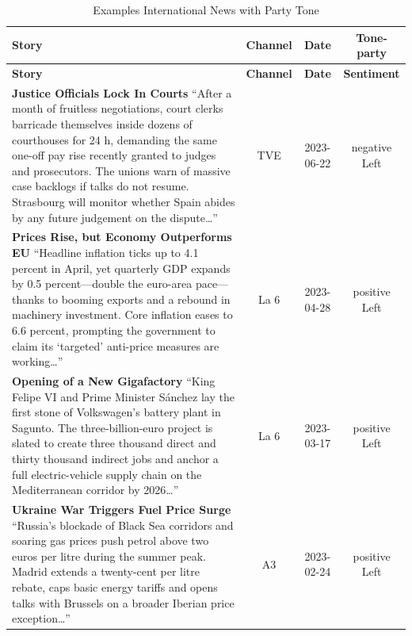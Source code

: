 \documentclass[12pt]{article}
\begin{document}
\begin{center}


\begin{longtable}{|p{8cm}|c|c|c|}
\caption{Examples International News with Party Tone}\\
	\hline
	\textbf{Story} & \textbf{Channel} & \textbf{Date} & \textbf{Tone-party} \\
	\hline
	\endfirsthead
	\hline
	\textbf{Story} & \textbf{Channel} & \textbf{Date} & \textbf{Sentiment} \\
	\hline
	\endhead
	
	\textbf{Justice Officials Lock In Courts}\newline
	{\scriptsize“After a month of fruitless negotiations, court clerks barricade themselves inside dozens of courthouses for 24 h, demanding the same one-off pay rise recently granted to judges and prosecutors.  The unions warn of massive case backlogs if talks do not resume.  Strasbourg will monitor whether Spain abides by any future judgement on the dispute…”}
	& TVE & 2023-06-22 & negative Left\\
	\hline
	
	\textbf{Prices Rise, but Economy Outperforms EU}\newline
	{\scriptsize“Headline inflation ticks up to 4.1 percent in April, yet quarterly GDP expands by 0.5 percent—double the euro-area pace—thanks to booming exports and a rebound in machinery investment.  Core inflation eases to 6.6 percent, prompting the government to claim its ‘targeted’ anti-price measures are working…”}
	& La 6 & 2023-04-28 & positive Left\\
	\hline
	
	\textbf{Opening of a New Gigafactory }\newline
	{\scriptsize“King Felipe VI and Prime Minister Sánchez lay the first stone of Volkswagen’s battery plant in Sagunto.  The three-billion-euro project is slated to create three thousand direct and thirty thousand indirect jobs and anchor a full electric-vehicle supply chain on the Mediterranean corridor by 2026…”}
	& La 6 & 2023-03-17 & positive Left\\
	\hline
	
	\textbf{Ukraine War Triggers Fuel Price Surge}\newline
	{\scriptsize“Russia’s blockade of Black Sea corridors and soaring gas prices push petrol above two euros per litre during the summer peak.  Madrid extends a twenty-cent per litre rebate, caps basic energy tariffs and opens talks with Brussels on a broader Iberian price exception…”}
	& A3 & 2023-02-24 & positive Left\\
	\hline
	

\end{longtable}
\end{center}
\end{document}
